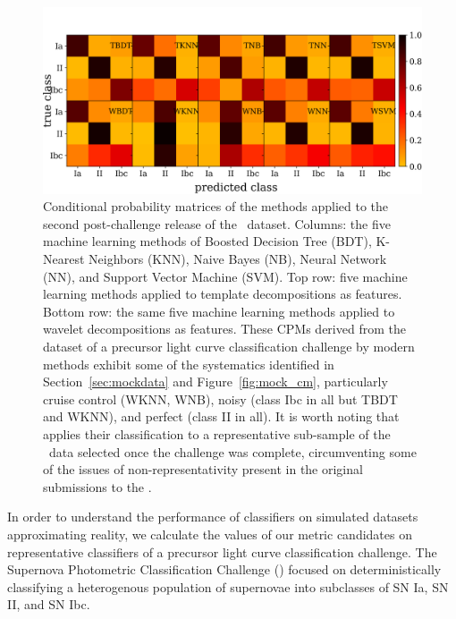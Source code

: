 \begin{figure}
	\begin{center}
    \includegraphics[width=\textwidth]{./fig/all_snphotcc_cm.png}
		\caption{Conditional probability matrices  of the \citet{lochner_photometric_2016} methods applied to the second post-challenge release of the \snphotcc\ dataset.
		Columns: the five machine learning methods of Boosted Decision Tree (BDT), K-Nearest Neighbors (KNN), Naive Bayes (NB), Neural Network (NN), and Support Vector Machine (SVM).
    Top row: five machine learning methods applied to template decompositions as features.
    Bottom row: the same five machine learning methods applied to wavelet decompositions as features.
		These CPMs derived from the dataset of a precursor light curve classification challenge by modern methods exhibit some of the systematics identified in Section~\ref{sec:mockdata} and Figure~\ref{fig:mock_cm}, particularly cruise control (WKNN, WNB), noisy (class Ibc in all but TBDT and WKNN), and perfect (class II in all).
		It is worth noting that \citet{lochner_photometric_2016} applies their classification to a representative sub-sample of the \snphotcc\ data selected once the challenge was complete, circumventing some of the issues of non-representativity present in the original submissions to the \snphotcc.}
		\label{fig:snphotcc_cm}
	\end{center}
\end{figure}


In order to understand the performance of classifiers on simulated datasets approximating reality, we calculate the values of our metric candidates on representative classifiers of a precursor light curve classification challenge.
The Supernova Photometric Classification Challenge (\snphotcc) \citep{kessler_supernova_2010} focused on deterministically classifying a heterogenous population of supernovae into subclasses of SN Ia, SN II, and SN Ibc.

